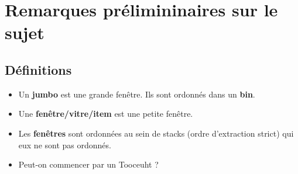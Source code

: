 \documentclass{article}
\title{}
\date{\today}
\author{}
\begin{document}
\tableofcontents

\section{Remarques prélimininaires sur le sujet}
    \subsection{Définitions}
        \begin{itemize}
            \item Un \textbf{jumbo} est une grande fenêtre. Ils sont ordonnés dans un \textbf{bin}.
            \item Une \textbf{fenêtre/vitre/item} est une petite fenêtre.
            \item Les \textbf{fenêtres} sont ordonnées au sein de stacks (ordre d'extraction strict) qui eux ne sont pas ordonnés.
            \item Peut-on commencer par un Tooceuht ?
        \end{itemize}





\end{document}
